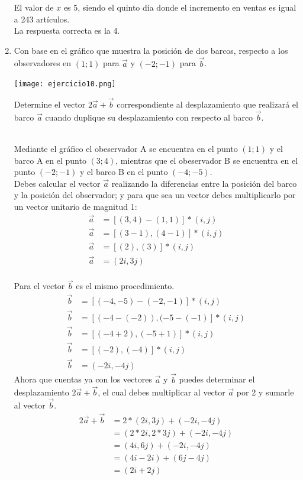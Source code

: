 \documentclass[11pt, a4paper]{article} %
\theoremstyle{dotlessP}
\theoremstyle{dotlessS}
\begin{document}
\begin{enumerate}[label=\color{dg}\theenumi.]
El valor de \( x \) es 5, siendo el quinto día donde el incremento en ventas es igual a 243 artículos.\\
{\color{dh} La respuesta correcta es la 4.}
\\
\item {\color{db} Con base en el gráfico que muestra la posición de dos barcos, respecto a los observadores en \((1; 1)\) para $\overrightarrow{a}$ y \((-2; -1)\) para $\overrightarrow{b}$.
 \begin{center}
	\texttt{[image: ejercicio10.png]}
\end{center}
Determine el vector $2$$\overrightarrow{a} + \overrightarrow{b}$ correspondiente al desplazamiento que realizará el barco $\overrightarrow{a}$ cuando duplique su desplazamiento con respecto al barco $\overrightarrow{b}$.
        }
\\ Mediante el gráfico el obeservador A se encuentra en el punto \((1; 1)\) y el barco A en el punto \((3; 4)\), mientras que el obeservador B se encuentra en el punto \((-2 ; -1)\) y el barco B en el punto \((-4; -5)\).
\\ Debes calcular el vector $\overrightarrow{a}$ realizando la diferencias entre la posición del barco y la posición del observador; y para que sea un vector debes multiplicarlo por un vector unitario de magnitud 1: 
\begin{align*}
\overrightarrow{a} &=[(3, 4)-(1, 1)]*(i,j)
\\
\overrightarrow{a} &=[(3-1),(4-1)]*(i,j)
\\
\overrightarrow{a} &=[(2),(3)]*(i,j)
\\
\overrightarrow{a} &=(2i,3j)
\end{align*}
\\ Para el vector $\overrightarrow{b}$ es el mismo procedimiento. 
\begin{align*}
\overrightarrow{b} &=[(-4, -5)-(-2, -1)]*(i,j)
\\
\overrightarrow{b} &=[(-4-(-2)),(-5-(-1)]*(i,j)
\\
\overrightarrow{b} &=[(-4+2),(-5+1)]*(i,j)
\\
\overrightarrow{b} &=[(-2),(-4)]*(i,j)
\\
\overrightarrow{b} &=(-2i,-4j)
\end{align*}
Ahora que cuentas ya con los vectores \(\overrightarrow {a}\) y \(\overrightarrow {b}\) puedes determinar el desplazamiento \(2 \overrightarrow{a} + \overrightarrow {b}\), el cual debes multiplicar al vector \(\overrightarrow {a}\) por 2 y sumarle al vector \(\overrightarrow {b}\).
\begin{align*}
2 \overrightarrow{a} + \overrightarrow{b} &=2*(2i,3j) + (-2i,-4j)
\\
&=(2*2i,2*3j) + (-2i,-4j)
\\
&=(4i,6j) + (-2i,-4j)
\\
&=(4i-2i) + (6j-4j)
\\
&=(2i + 2j)
\end{align*}

\end{enumerate}

\end{document}
